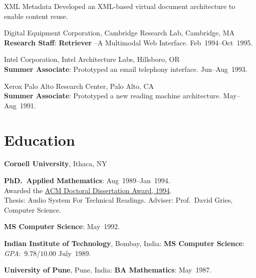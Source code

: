 \documentclass{article}
\begin{document}
\begin{compactitem}
\begin{compactdesc}
  
\item[XML Metadata] Developed an XML-based virtual document
  architecture to enable  content reuse.
\end{compactdesc}
\item   {Digital Equipment Corporation},  {Cambridge Research Lab}, Cambridge, MA\\
  \textbf{Research Staff}: \textbf{Retriever} --A Multimodal Web
  Interface.  \hfill Feb~1994--Oct~1995.
\item {Intel Corporation}, {Intel Architecture Labs},
  Hillsboro, OR\\
  \textbf{Summer Associate}: Prototyped an email telephony
  interface. \hfill Jun--Aug~1993.
\item {Xerox Palo Alto Research Center}, Palo Alto, CA\\
  \textbf{Summer Associate}: Prototyped a new reading machine
  architecture. \hfill May--Aug~1991.
\end{compactitem}



\section*{Education}

\begin{compactitem}
\item \textbf{Cornell University}, Ithaca, NY
\begin{compactitem}
\item \textbf{PhD.\ Applied Mathematics}: \hfill
  Aug~1989--Jan~1994.\\
  \hspace*{.1in} Awarded the
\href{http://awards.acm.org/award_winners/raman_4110221.cfm}{%
  ACM Doctoral Dissertation Award, 1994}.\\
\hspace*{.1in} {Thesis}: {Audio System For Technical Readings}.
 {Adviser}: Prof.\  David Gries, Computer Science.
\item \textbf{MS Computer Science}: \hfill May~1992.
\end{compactitem}
\item \textbf{Indian Institute of Technology}, Bombay, India:
  \textbf{MS Computer Science}: \textit{GPA\/}:~$9.78/10.00$
  \hfill July~1989.
\item \textbf{University of Pune}, Pune, India: \textbf{BA
    Mathematics}: \hfill May~1987.
\end{compactitem}
\end{document}
